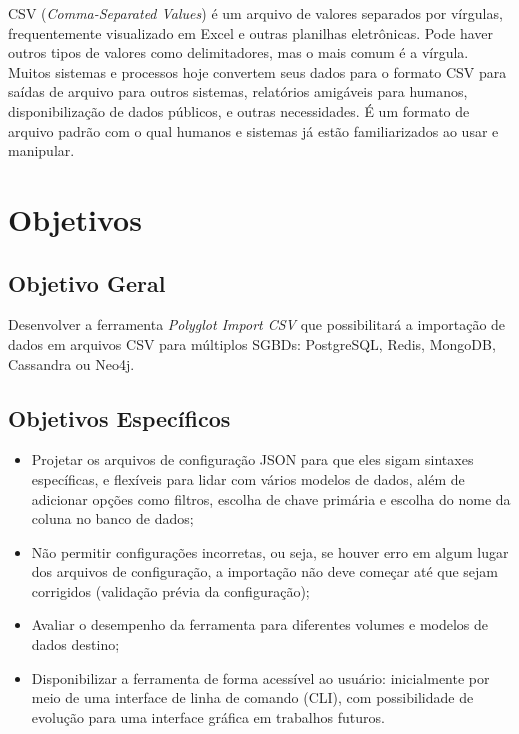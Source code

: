 CSV (\textit{Comma-Separated Values}) é um arquivo de valores separados por vírgulas,
frequentemente visualizado em Excel e outras planilhas eletrônicas. Pode haver outros tipos
de valores como delimitadores, mas o mais comum é a vírgula. Muitos sistemas e processos
hoje convertem seus dados para o formato CSV para saídas de arquivo para outros sistemas,
relatórios amigáveis para humanos, disponibilização de dados públicos, e outras
necessidades. É um formato de arquivo padrão com o qual humanos e sistemas já estão
familiarizados ao usar e manipular.

\section{Objetivos}

\subsection{Objetivo Geral}

Desenvolver a ferramenta \textit{Polyglot Import CSV} que possibilitará a importação de
dados em arquivos CSV para múltiplos SGBDs: PostgreSQL, Redis, MongoDB, Cassandra ou
Neo4j.

\subsection{Objetivos Específicos}

\begin{itemize}
  \item Projetar os arquivos de configuração JSON para que eles sigam sintaxes específicas,
        e flexíveis para lidar com vários modelos de dados, além de adicionar opções como
        filtros, escolha de chave primária e escolha do nome da coluna no banco de dados;
  \item Não permitir configurações incorretas, ou seja, se houver erro em algum lugar dos
        arquivos de configuração, a importação não deve começar até que sejam corrigidos
        (validação prévia da configuração);
  \item Avaliar o desempenho da ferramenta para diferentes volumes e modelos de dados
        destino;
  \item Disponibilizar a ferramenta de forma acessível ao usuário: inicialmente por meio de
        uma interface de linha de comando (CLI), com possibilidade de evolução para uma
        interface gráfica em trabalhos futuros.
\end{itemize}

